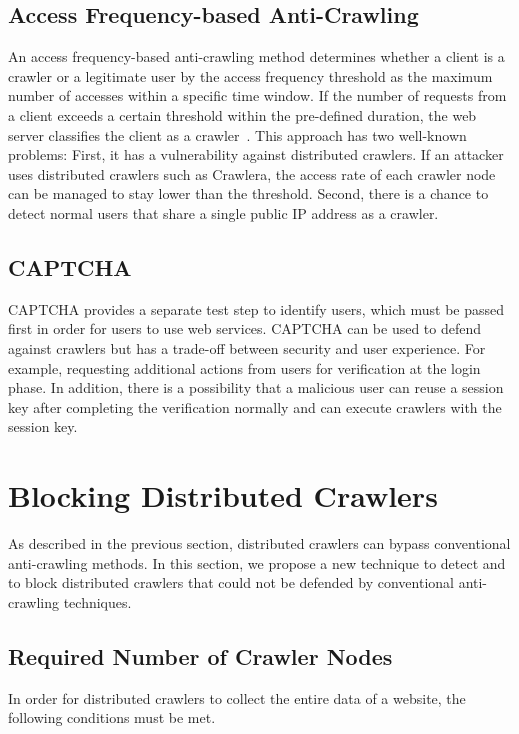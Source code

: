 \documentclass[sigconf,review]{acmart}
\begin{document}
\subsection{Access Frequency-based Anti-Crawling}
An access frequency-based anti-crawling method determines whether a client is a crawler or a legitimate user by the access frequency threshold as the maximum number of accesses within a specific time window. If the number of requests from a client exceeds a certain threshold within the pre-defined duration, the web server classifies the client as a crawler~\cite{r14}.
This approach has two well-known problems: First, it has a vulnerability against distributed crawlers. If an attacker uses distributed crawlers such as Crawlera, the access rate of each crawler node can be managed to stay lower than the threshold. Second, there is a chance to detect normal users that share a single public IP address as a crawler.

\subsection{CAPTCHA}
CAPTCHA provides a separate test step to identify users, which must be passed first in order for users to use web services. CAPTCHA can be used to defend against crawlers but has a trade-off between security and user experience. For example, requesting additional actions from users for verification at the login phase. In addition, there is a possibility that a malicious user can reuse a session key after completing the verification normally and can execute crawlers with the session key.

%
%
\section{Blocking Distributed Crawlers}
As described in the previous section, distributed crawlers can bypass conventional anti-crawling methods. In this section, we propose a new technique to detect and to block distributed crawlers that could not be defended by conventional anti-crawling techniques.

\subsection{Required Number of Crawler Nodes}
In order for distributed crawlers to collect the entire data of a website, the following conditions must be met.
\end{document}
